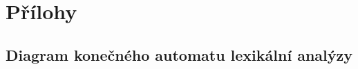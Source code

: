 \documentclass[a4paper, 12pt]{article}
\begin{document}
\newpage
\section{Přílohy} \label{prilohy}

\renewcommand\thesubsection{\thesection.\Alph{subsection}}


\subsection{Diagram konečného automatu lexikální analýzy \cite{automata}} \label{subsec:automat}
\end{document}
